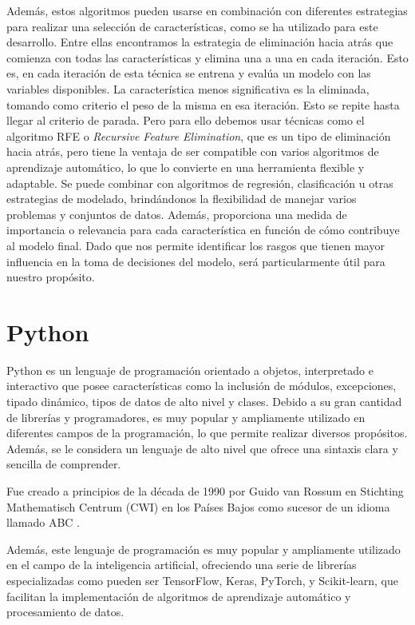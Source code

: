 Además, estos algoritmos pueden usarse en combinación con diferentes estrategias para realizar una selección de características, como se ha utilizado para este desarrollo. Entre ellas encontramos la estrategia de eliminación hacia atrás que comienza con todas las características y elimina una a una en cada iteración. Esto es, en cada iteración de esta técnica se entrena y evalúa un modelo con las variables disponibles. La característica menos significativa es la eliminada, tomando como criterio el peso de la misma en esa iteración. Esto se repite hasta llegar al criterio de parada.
\label{RFE}
Pero para ello debemos usar técnicas como el algoritmo RFE o \textit{Recursive Feature Elimination}, que es un tipo de eliminación hacia atrás, pero tiene la ventaja de ser compatible con varios algoritmos de aprendizaje automático, lo que lo convierte en una herramienta flexible y adaptable. Se puede combinar con algoritmos de regresión, clasificación u otras estrategias de modelado, brindándonos la flexibilidad de manejar varios problemas y conjuntos de datos. Además, proporciona una medida de importancia o relevancia para cada característica en función de cómo contribuye al modelo final. Dado que nos permite identificar los rasgos que tienen mayor influencia en la toma de decisiones del modelo, será particularmente útil para nuestro propósito.


\section{Python}

Python \cite{python} es un lenguaje de programación orientado a objetos, interpretado e interactivo que posee características como la inclusión de módulos, excepciones, tipado dinámico, tipos de datos de alto nivel y clases. Debido a su gran cantidad de librerías y programadores, es muy popular y ampliamente utilizado en diferentes campos de la programación, lo que permite realizar diversos propósitos. Además, se le considera un lenguaje de alto nivel que ofrece una sintaxis clara y sencilla de comprender. 

Fue creado a principios de la década de 1990 por Guido van Rossum en Stichting Mathematisch Centrum (CWI) en los Países Bajos como sucesor de un idioma llamado ABC \cite{pythonhistory}. 

Además, este lenguaje de programación es muy popular y ampliamente utilizado en el campo de la inteligencia artificial, ofreciendo una serie de librerías especializadas como pueden ser TensorFlow, Keras, PyTorch, y Scikit-learn, que facilitan la implementación de algoritmos de aprendizaje automático y procesamiento de datos. 


